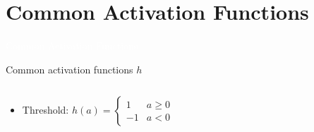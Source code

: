 \documentclass[11pt,table]{beamer}
\begin{document}
\section{Common Activation Functions}
{
\begin{frame}
\centering
\Huge
\textcolor{white}{Common Activation Functions}
\thispagestyle{empty}
\end{frame}
}

\begin{frame}{Common activation functions $h$}
    \begin{columns}[T]
\begin{column}{0.4\textwidth}
\begin{itemize}
    \item  Threshold: $h(a)=\left\{\begin{array}{cc}1 & a \geq 0 \\ -1 & a<0\end{array}\right.$\\[3ex]

\end{itemize}
\end{column}
\begin{column}{0.6\textwidth}
\centering
{}
\end{column}
\end{columns}
\vspace{4mm}


\end{frame}
\end{document}

